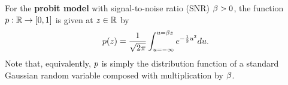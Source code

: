 \begin{definition}
\label{def:p:probit}
%
For the {\bf probit model} with signal-to-noise ratio (SNR) \(  \beta > 0  \), the function
\(  p : \mathbb{R} \to [0,1]  \)
is given at \(  z \in \mathbb{R}  \) by
\begin{gather}
  p( z )
  =
  \frac{1}{\sqrt{2\pi}}
  \int_{u=-\infty}^{u=\beta z}
  e^{-\frac{1}{2} u^{2}}
  du
.\end{gather}
Note that, equivalently, \(  p  \) is simply the distribution function of a standard Gaussian random variable composed with multiplication by \(  \beta  \).
\end{definition}


